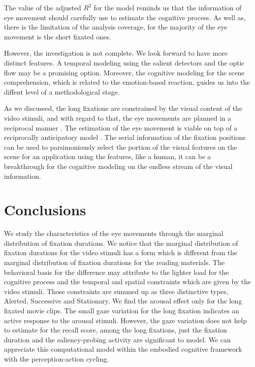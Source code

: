 \documentclass[oneside,master]{snueethesis}
\begin{document}
The value of the adjusted $R^{2}$ for the model reminds us that the information of eye movement should carefully use to estimate the cognitive process. As well as, there is the limitation of the analysis coverage, for the majority of the eye movement is the short fixated ones. 

However, the investigation is not complete. We look forward to have more distinct features. A temporal modeling using the salient detectors \cite{marr1980,canny1986} and the optic flow \cite{koenderink1986} may be a promising option. Moreover, the cognitive modeling for the scene comprehension, which is related to the emotion-based reaction, guides us into the diffent level of a methodological stage. 

As we discussed, the long fixations are constrained by the visual content of the video stimuli, and with regard to that, the eye movements are planned in a reciprocal manner \cite{zhang2013}. The estimation of the eye movement is viable on top of a reciprocally anticipatory model \cite{robert1985anticipatory}. The serial information of the fixation positions can be used to parsimoniously select the portion of the visual features on the scene for an application using the features, like a human, it can be a breakthrough for the cognitive modeling on the endless stream of the visual information.


\chapter{Conclusions}

We study the characteristics of the eye movements through the marginal distribution of fixation durations. We notice that the marginal distribution of fixation durations for the video stimuli has a form which is different from the marginal distribution of fixation durations for the reading materials. The behavioral basis for the difference may attribute to the lighter load for the cognitive process and the temporal and spatial constraints which are given by the video stimuli. Those constraints are summed up as three distinctive types, Alerted, Successive and Stationary. We find the arousal effect only for the long fixated movie clips. The small gaze variation for the long fixation indicates an active response to the arousal stimuli. However, the gaze variation does not help to estimate for the recall score, among the long fixations, just the fixation duration and the saliency-probing activity are significant to model. We can appreciate this computational model within the embodied cognitive framework with the perception-action cycling.
\end{document}

